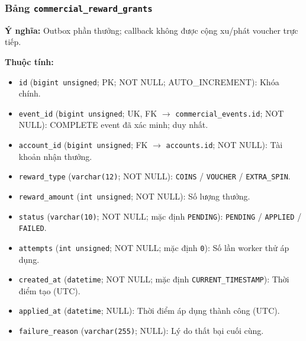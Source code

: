 \subsubsection{Bảng \texttt{commercial\_reward\_grants}}

\textbf{Ý nghĩa:} Outbox phần thưởng; callback không được cộng xu/phát voucher trực tiếp.\par

\textbf{Thuộc tính:}

\begin{itemize}

\item \texttt{id} (\texttt{bigint unsigned}; PK; NOT NULL; AUTO_INCREMENT): Khóa chính.

\item \texttt{event\_id} (\texttt{bigint unsigned}; UK, FK $\rightarrow$ \texttt{commercial\_events.id}; NOT NULL): COMPLETE event đã xác minh; duy nhất.

\item \texttt{account\_id} (\texttt{bigint unsigned}; FK $\rightarrow$ \texttt{accounts.id}; NOT NULL): Tài khoản nhận thưởng.

\item \texttt{reward\_type} (\texttt{varchar(12)}; NOT NULL): \texttt{COINS} / \texttt{VOUCHER} / \texttt{EXTRA\_SPIN}.

\item \texttt{reward\_amount} (\texttt{int unsigned}; NOT NULL): Số lượng thưởng.

\item \texttt{status} (\texttt{varchar(10)}; NOT NULL; mặc định \texttt{PENDING}): \texttt{PENDING} / \texttt{APPLIED} / \texttt{FAILED}.

\item \texttt{attempts} (\texttt{int unsigned}; NOT NULL; mặc định \texttt{0}): Số lần worker thử áp dụng.

\item \texttt{created\_at} (\texttt{datetime}; NOT NULL; mặc định \texttt{CURRENT\_TIMESTAMP}): Thời điểm tạo (UTC).

\item \texttt{applied\_at} (\texttt{datetime}; NULL): Thời điểm áp dụng thành công (UTC).

\item \texttt{failure\_reason} (\texttt{varchar(255)}; NULL): Lý do thất bại cuối cùng.

\end{itemize}


